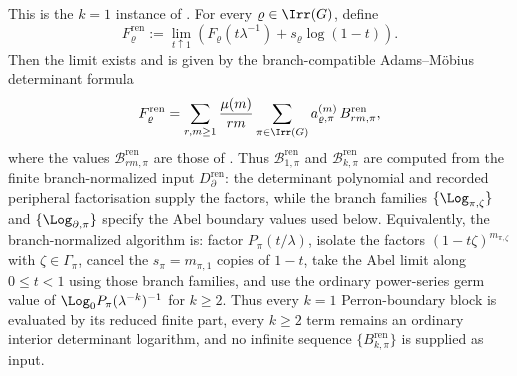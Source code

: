 \begin{proposition}
  This is the \(k=1\) instance of
  .  For every
  \(\varrho\in\Irr(G)\), define
  \begin{equation}\label{eq:renormalized-fixed-label-def}
    F_\varrho^{\mathrm{ren}}
    :=
    \lim_{t\uparrow1}
      \left(F_\varrho(t\lambda^{-1})+s_\varrho\log(1-t)\right).
  \end{equation}
  Then the limit exists and is given by the branch-compatible
  Adams--M\"obius determinant formula
  \begin{equation}\label{eq:renormalized-fixed-label-determinant}
    F_\varrho^{\mathrm{ren}}
    =
    \sum_{r,m\ge1}\frac{\mu(m)}{rm}
      \sum_{\pi\in\Irr(G)}
        a_{\varrho,\pi}^{(m)}\,
        B_{rm,\pi}^{\mathrm{ren}},
  \end{equation}
  where the values \(\mathcal B_{rm,\pi}^{\mathrm{ren}}\) are those of
  .  Thus
  \(\mathcal B_{1,\pi}^{\mathrm{ren}}\) and
  \(\mathcal B_{k,\pi}^{\mathrm{ren}}\) are computed from the finite
  branch-normalized input \(D_{\partial}^{\mathrm{ren}}\): the determinant
  polynomial and recorded peripheral factorisation supply the factors, while
  the branch families \(\{\Log_{\pi,\zeta}\}\) and
  \(\{\Log_{\partial,\pi}\}\) specify the Abel boundary values used below.
  Equivalently, the branch-normalized algorithm is:
  factor \(P_\pi(t/\lambda)\), isolate the factors
  \((1-t\zeta)^{m_{\pi,\zeta}}\) with \(\zeta\in\Gamma_\pi\), cancel the
  \(s_\pi=m_{\pi,1}\) copies of \(1-t\), take the Abel limit along
  \(0\le t<1\) using those branch families, and use the ordinary power-series
  germ value of \(\Log_0 P_\pi(\lambda^{-k})^{-1}\) for \(k\ge2\).  Thus every \(k=1\)
  Perron-boundary block is evaluated by its reduced finite part, every
  \(k\ge2\) term remains an ordinary interior determinant logarithm, and no
  infinite sequence \(\{B_{k,\pi}^{\mathrm{ren}}\}\) is supplied as input.
\end{proposition}

